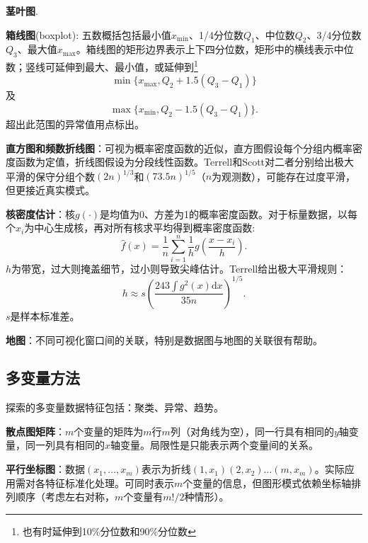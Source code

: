 \par \textbf{茎叶图}.
\par \textbf{箱线图}(boxplot): 五数概括包括最小值$x_{\min}$、1/4分位数$Q_1$、中位数$Q_2$、3/4分位数$Q_3$、最大值$x_{\max}$。箱线图的矩形边界表示上下四分位数，矩形中的横线表示中位数；竖线可延伸到最大、最小值，或延伸到\footnote{也有时延伸到10\%分位数和90\%分位数}
\begin{equation}
    \min \{x_{\max}, Q_2+1.5(Q_3-Q_1)\}
\end{equation}
及
\begin{equation}
    \max \{x_{\min}, Q_2-1.5(Q_3-Q_1)\}.
\end{equation}
超出此范围的异常值用点标出。

\par\textbf{直方图和频数折线图}：可视为概率密度函数的近似，直方图假设每个分组内概率密度函数为定值，折线图假设为分段线性函数。Terrell和Scott对二者分别给出极大平滑的保守分组个数$(2n)^{1/3}$和$(73.5n)^{1/5}$（$n$为观测数），可能存在过度平滑，但更接近真实模式。

\par \textbf{核密度估计}：核$g(\cdot)$是均值为0、方差为1的概率密度函数。对于标量数据，以每个$x_i$为中心生成核，再对所有核求平均得到概率密度函数:
\begin{equation}
    \hat{f}(x)=\frac{1}{n}\sum_{i=1}^n \frac{1}{h}g\left(\frac{x-x_i}{h}\right).
\end{equation}
$h$为带宽，过大则掩盖细节，过小则导致尖峰估计。Terrell给出极大平滑规则：
\begin{equation}
    h \approx s\left(\frac{243\int g^2(x)\text{d} x}{35n}\right)^{1/5}.
\end{equation}
$s$是样本标准差。

\par \textbf{地图}：不同可视化窗口间的关联，特别是数据图与地图的关联很有帮助。

\subsection{多变量方法}

\par 探索的多变量数据特征包括：聚类、异常、趋势。

\par \textbf{散点图矩阵}：$m$个变量的矩阵为$m$行$m$列（对角线为空），同一行具有相同的$y$轴变量，同一列具有相同的$x$轴变量。局限性是只能表示两个变量间的关系。

\par \textbf{平行坐标图}：数据$(x_1,\dots,x_m)$表示为折线$(1,x_1)(2,x_2)\dots(m,x_m)$。实际应用需对各特征标准化处理。可同时表示$m$个变量的信息，但图形模式依赖坐标轴排列顺序（考虑左右对称，$m$个变量有$m!/2$种情形）。

